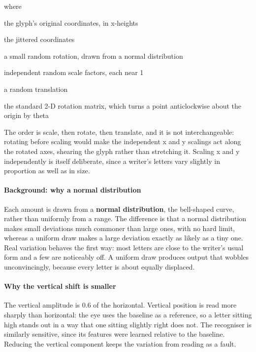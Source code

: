 \noindent where
\begin{description}[leftmargin=2.4em,style=nextline,font=\normalfont\ttfamily]\setlength\itemsep{1pt}
  \item[{$x,\,y$}] \normalfont the glyph's original coordinates, in x-heights
  \item[{$x',\,y'$}] \normalfont the jittered coordinates
  \item[{$\theta$}] \normalfont a small random rotation, drawn from a normal distribution
  \item[{$s_x,\,s_y$}] \normalfont independent random scale factors, each near 1
  \item[{$\delta_x,\,\delta_y$}] \normalfont a random translation
  \item[{$\begin{pmatrix}\cos\theta & -\sin\theta \\ \sin\theta & \cos\theta\end{pmatrix}$}] \normalfont the standard 2-D rotation matrix, which turns a point anticlockwise about the origin by theta
\end{description}
The order is scale, then rotate, then translate, and it is not interchangeable: rotating before scaling would make the independent x and y scalings act along the rotated axes, shearing the glyph rather than stretching it. Scaling x and y independently is itself deliberate, since a writer's letters vary slightly in proportion as well as in size.


\paragraph{Background: why a normal distribution}
Each amount is drawn from a \textbf{normal distribution}, the bell-shaped curve, rather than uniformly from a range. The difference is that a normal distribution makes small deviations much commoner than large ones, with no hard limit, whereas a uniform draw makes a large deviation exactly as likely as a tiny one. Real variation behaves the first way: most letters are close to the writer's usual form and a few are noticeably off. A uniform draw produces output that wobbles unconvincingly, because every letter is about equally displaced.


\paragraph{Why the vertical shift is smaller}
The vertical amplitude is 0.6 of the horizontal. Vertical position is read more sharply than horizontal: the eye uses the baseline as a reference, so a letter sitting high stands out in a way that one sitting slightly right does not. The recogniser is similarly sensitive, since its features were learned relative to the baseline. Reducing the vertical component keeps the variation from reading as a fault.


